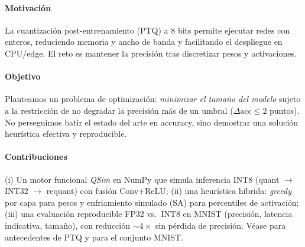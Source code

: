 \paragraph{Motivación}
La cuantización post-entrenamiento (PTQ) a 8 bits permite ejecutar redes con enteros, reduciendo memoria y ancho de banda y facilitando el despliegue en CPU/edge. El reto es mantener la precisión tras discretizar pesos y activaciones.

\paragraph{Objetivo}
Planteamos un problema de optimización: \emph{minimizar el tamaño del modelo} sujeto a la restricción de no degradar la precisión más de un umbral ($\Delta\mathrm{acc}\leq 2$ puntos). No perseguimos batir el estado del arte en accuracy, sino demostrar una solución heurística efectiva y reproducible.

\paragraph{Contribuciones}
(i) Un motor funcional \emph{QSim} en NumPy que simula inferencia INT8 (quant $\rightarrow$ INT32 $\rightarrow$ requant) con fusión Conv+ReLU; (ii) una heurística híbrida: \emph{greedy} por capa para pesos y enfriamiento simulado (SA) para percentiles de activación; (iii) una evaluación reproducible FP32 vs.\ INT8 en MNIST (precisión, latencia indicativa, tamaño), con reducción $\sim 4\times$ sin pérdida de precisión.
Véase \parencite{Jacob2018CVPR,Krishnamoorthi2018Whitepaper} para antecedentes de PTQ y \parencite{LeCun1998ProcIEEE,MNIST} para el conjunto MNIST.
